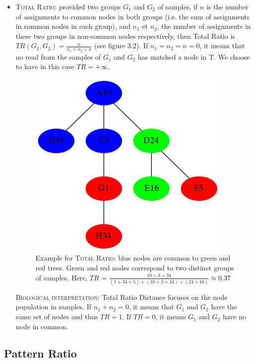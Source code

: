 \documentclass{report}
\begin{document}
\begin{itemize}
\item \textsc{Total Ratio:} provided two groups $G_{1}$ and $G_{2}$ of samples, if $n$ is the number of assignments to common nodes in both groups (i.e. the sum of assignments in common nodes in each group), and $n_{1}$ et $n_{2}$, the number of assignments in these two groups in non-common nodes respectively, then Total Ratio is $TR(G_{1},G_{2}) = \frac{n}{n_{1} + n_{2} + n}$ (see figure $3.2$). If $n_{1} = n_{2} = n = 0$, it means that no read from the samples of $G_{1}$ and $G_{2}$ has matched a node in \textsc{T}. We choose to have in this case $TR = +\infty$.

\begin{figure}[H]
\centering
\includegraphics[scale=0.5]{illustrations/totalratio.png}
\caption{Example for \textsc{Total Ratio}: blue nodes are common to green and red trees. Green and red nodes correspond to two distinct groups of samples. Here, $TR$ = $\frac{10 + 3 + 34}{(1 + 34 + 5) + (10 + 3 + 34) + (24 + 16)} \simeq 0.37$}
\end{figure}

\bigskip

  \textsc{Biological interpretation:} Total Ratio Distance focuses on the node population in samples. If $n_{1} + n_{2} = 0$, it means that $G_{1}$ and $G_{2}$ have the same set of nodes and thus $TR = 1$. If $TR = 0$, it means $G_{1}$ and $G_{2}$ have no node in common.
\end{itemize}

\subsection{Pattern Ratio}
\end{document}
